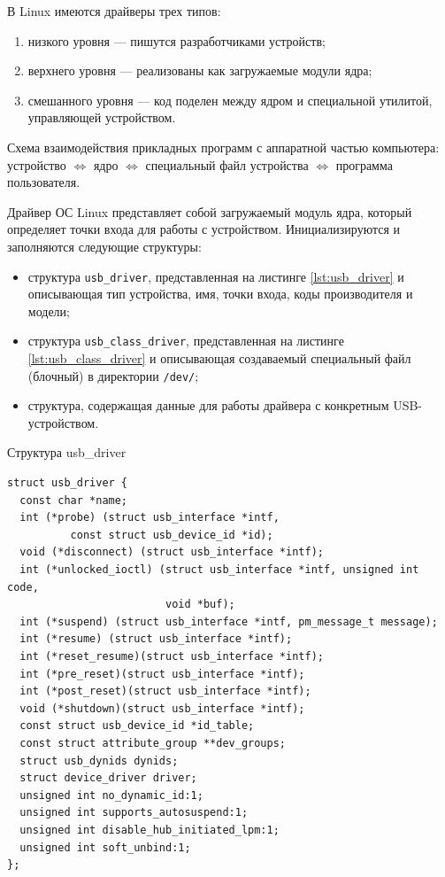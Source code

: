 В Linux имеются драйверы трех типов:
\begin{enumerate}
	\item низкого уровня --- пишутся разработчиками устройств;
	\item верхнего уровня --- реализованы как загружаемые модули ядра;
	\item смешанного уровня --- код поделен между ядром и специальной утилитой, управляющей устройством.
\end{enumerate}

Схема взаимодействия прикладных программ с аппаратной частью компьютера: устройство $\Leftrightarrow$ ядро $\Leftrightarrow$ специальный файл устройства $\Leftrightarrow$ программа пользователя.

Драйвер ОС Linux представляет собой загружаемый модуль ядра, который определяет точки входа для работы с устройством.
Инициализируются и заполняются следующие структуры:

\begin{itemize}
	\item структура \texttt{usb\_driver}, представленная на листинге \ref{lst:usb_driver} и описывающая тип устройства, имя, точки входа, коды производителя и модели;
	\item структура \texttt{usb\_class\_driver}, представленная на листинге \ref{lst:usb_class_driver} и описывающая создаваемый специальный файл (блочный) в директории \texttt{/dev/};
	\item структура, содержащая данные для работы драйвера с конкретным USB-устройством.
\end{itemize}

\begin{longlisting}
	\singlespacing
	\caption{Структура usb\_driver}
	\label{lst:usb_driver}
	\begin{verbatim}
struct usb_driver {
  const char *name;	
  int (*probe) (struct usb_interface *intf, 
  	      const struct usb_device_id *id);
  void (*disconnect) (struct usb_interface *intf);
  int (*unlocked_ioctl) (struct usb_interface *intf, unsigned int code,
                         void *buf);
  int (*suspend) (struct usb_interface *intf, pm_message_t message);
  int (*resume) (struct usb_interface *intf);
  int (*reset_resume)(struct usb_interface *intf);
  int (*pre_reset)(struct usb_interface *intf);
  int (*post_reset)(struct usb_interface *intf);
  void (*shutdown)(struct usb_interface *intf);
  const struct usb_device_id *id_table;
  const struct attribute_group **dev_groups;
  struct usb_dynids dynids;
  struct device_driver driver;
  unsigned int no_dynamic_id:1;
  unsigned int supports_autosuspend:1;
  unsigned int disable_hub_initiated_lpm:1;
  unsigned int soft_unbind:1;
};
	\end{verbatim}
\end{longlisting}

